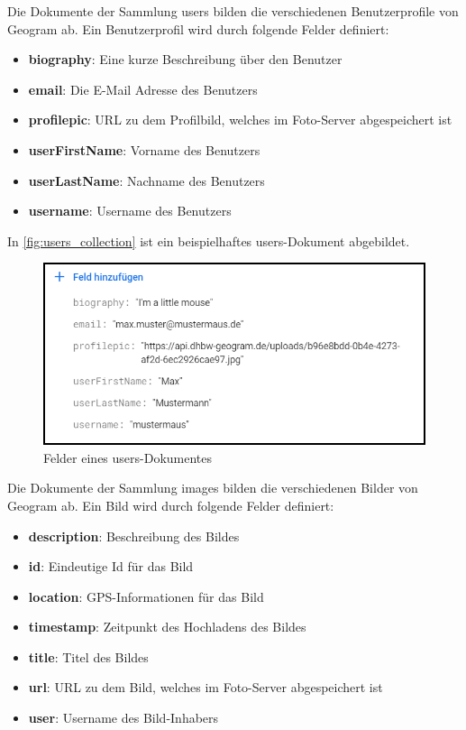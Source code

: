 Die Dokumente der Sammlung \glqq users\grqq{} bilden die verschiedenen Benutzerprofile von Geogram ab. Ein Benutzerprofil wird durch folgende Felder definiert:

\begin{itemize}
    \item \textbf{biography}: Eine kurze Beschreibung über den Benutzer
    \item \textbf{email}: Die E-Mail Adresse des Benutzers
    \item \textbf{profilepic}: URL zu dem Profilbild, welches im Foto-Server abgespeichert ist
    \item \textbf{userFirstName}: Vorname des Benutzers
    \item \textbf{userLastName}: Nachname des Benutzers
    \item \textbf{username}: Username des Benutzers
\end{itemize}

In \autoref{fig:users_collection} ist ein beispielhaftes users-Dokument abgebildet.

\begin{figure}[H]
    \centering
    \includegraphics[width=.7\linewidth]{images/collection_users.png}
    \caption{Felder eines \glqq users\grqq{}-Dokumentes}
    \label{fig:users_collection}
\end{figure}

Die Dokumente der Sammlung \glqq images\grqq{} bilden die verschiedenen Bilder von Geogram ab. Ein Bild wird durch folgende Felder definiert:

\begin{itemize}
    \item \textbf{description}: Beschreibung des Bildes
    \item \textbf{id}: Eindeutige Id für das Bild
    \item \textbf{location}: GPS-Informationen für das Bild
    \item \textbf{timestamp}: Zeitpunkt des Hochladens des Bildes
    \item \textbf{title}: Titel des Bildes
    \item \textbf{url}: URL zu dem Bild, welches im Foto-Server abgespeichert ist
    \item \textbf{user}: Username des Bild-Inhabers
\end{itemize}

